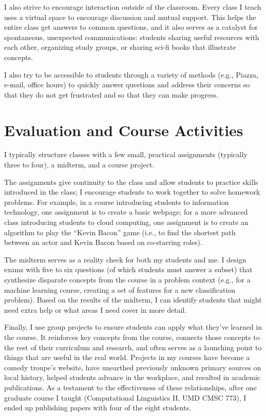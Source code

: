\documentclass[11pt]{amsart}
\begin{document}
I also strive to encourage interaction outside of the classroom.  Every class I
teach uses a virtual space to encourage discussion and mutual support.  This
helps the entire class get answers to common questions, and it also serves as a
catalyst for spontaneous, unexpected communications: students sharing useful
resources with each other, organizing study groups, or sharing sci-fi books that
illustrate concepts.

I also try to be accessible to students through a variety of methods (e.g.,
Piazza, e-mail, office hours) to quickly answer questions and address their
concerns so that they do not get frustrated and so that they can make progress.

\section{Evaluation and Course Activities}

I typically structure classes with a few small, practical assignments (typically
three to four), a midterm, and a course project.

The assignments give continuity to the class and allow students to practice
skills introduced in the class; I encourage students to work together to solve
homework problems.  For example, in a course introducing students to information
technology, one assignment is to create a basic webpage; for a more advanced
class introducing students to cloud computing, one assignment is to create an
algorithm to play the ``Kevin Bacon'' game (i.e., to find the shortest path
between an actor and Kevin Bacon based on co-starring roles).

The midterm serves as a reality check for both my students and me.  I design
exams with five to six questions (of which students must answer a subset) that
synthesize disparate concepts from the course in a problem context (e.g., for a
machine learning course, creating a set of features for a new classification
problem).  Based on the results of the midterm, I can identify students that
might need extra help or what areas I need cover in more detail.

Finally, I use group projects to ensure students can apply what
they've learned in the course.  It reinforces key concepts from the
course, connects those concepts to the rest of their curriculum and
research, and often serves as a launching point to things that are
useful in the real world.  Projects in my courses have become a comedy
troupe's website, have unearthed previously unknown primary sources on
local history, helped students advance in the workplace, and resulted
in academic publications.  As a testament to the effectiveness of
these relationships, after one graduate course I taught (Computational
Linguistics II, UMD CMSC 773), I ended up publishing papers with four
of the eight students.
\end{document}
